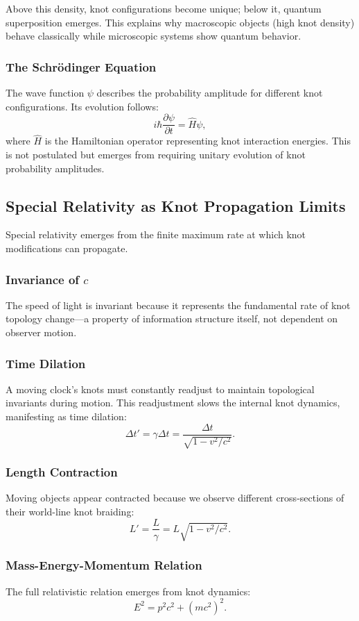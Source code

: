 \documentclass{article}
\begin{document}
Above this density, knot configurations become unique; below it, quantum superposition emerges. This explains why macroscopic objects (high knot density) behave classically while microscopic systems show quantum behavior.

\subsubsection{The Schrödinger Equation}
The wave function $\psi$ describes the probability amplitude for different knot configurations. Its evolution follows:
\[
i \hbar \frac{\partial \psi}{\partial t} = \hat{H} \psi,
\]
where $\hat{H}$ is the Hamiltonian operator representing knot interaction energies. This is not postulated but emerges from requiring unitary evolution of knot probability amplitudes.

\subsection{Special Relativity as Knot Propagation Limits}
Special relativity emerges from the finite maximum rate at which knot modifications can propagate.

\subsubsection{Invariance of \texorpdfstring{$c$}{c}}
The speed of light is invariant because it represents the fundamental rate of knot topology change—a property of information structure itself, not dependent on observer motion.

\subsubsection{Time Dilation}
A moving clock's knots must constantly readjust to maintain topological invariants during motion. This readjustment slows the internal knot dynamics, manifesting as time dilation:
\[
\Delta t' = \gamma \Delta t = \frac{\Delta t}{\sqrt{1 - v^2 / c^2}}.
\]

\subsubsection{Length Contraction}
Moving objects appear contracted because we observe different cross-sections of their world-line knot braiding:
\[
L' = \frac{L}{\gamma} = L \sqrt{1 - v^2 / c^2}.
\]

\subsubsection{Mass-Energy-Momentum Relation}
The full relativistic relation emerges from knot dynamics:
\[
E^2 = p^2 c^2 + (m c^2)^2.
\]
\end{document}
